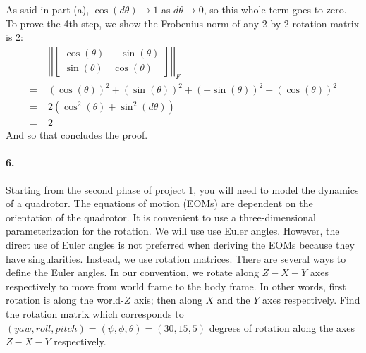 \documentclass[english]{article}
\begin{document}
\begin{enumerate}
As said in part (a), $\cos(d\theta) \rightarrow 1$ as $d\theta \rightarrow 0$, so this whole term goes to zero. To prove the 4th step, we show the Frobenius norm of any 2 by 2 rotation matrix is 2:
\begin{align*}
&\; \left| \left| \begin{bmatrix}
			\cos(\theta) & -\sin(\theta) \\
			\sin(\theta) &  \cos(\theta)
		\end{bmatrix} \right| \right|_F \\
=&\; (\cos(\theta))^2 + (\sin(\theta))^2 + (-\sin(\theta))^2 + (\cos(\theta))^2 \\
=&\; 2(\cos^2(\theta) + \sin^2(d\theta)) \\
=&\; 2
\end{align*}
And so that concludes the proof.

\end{enumerate}


\paragraph{6.}

Starting from the second phase of project 1, you will need to model the dynamics of a quadrotor.
The equations of motion (EOMs) are dependent on the orientation of the quadrotor.
It is convenient to use a three-dimensional parameterization for the rotation. We will use use Euler angles.
However, the direct use of Euler angles is not preferred when deriving the EOMs because they have singularities. Instead, we use rotation matrices. 
There are several ways to define the Euler angles. 
In our convention, we rotate along $Z-X-Y$ axes respectively to move from world frame to the body frame. 
In other words, first rotation is along the world-$Z$ axis; then along $X$ and the $Y$ axes respectively. 
Find the rotation matrix which corresponds to $(yaw, roll, pitch) = (\psi,\phi,\theta) = (30, 15, 5)$ degrees of rotation along the axes $Z-X-Y$ respectively.
\end{document}
